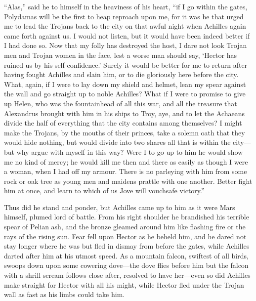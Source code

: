“Alas,” said he to himself in the heaviness of his heart, “if I go within
the gates, Polydamas will be the first to heap reproach upon me, for it
was he that urged me to lead the Trojans back to the city on that awful
night when Achilles again came forth against us. I would not listen, but
it would have been indeed better if I had done so. Now that my folly has
destroyed the host, I dare not look Trojan men and Trojan women in the
face, lest a worse man should say, ‘Hector has ruined us by his
self-confidence.’ Surely it would be better for me to return after having
fought Achilles and slain him, or to die gloriously here before the city.
What, again, if I were to lay down my shield and helmet, lean my spear
against the wall and go straight up to noble Achilles? What if I were to
promise to give up Helen, who was the fountainhead of all this war, and
all the treasure that Alexandrus brought with him in his ships to Troy,
aye, and to let the Achaeans divide the half of everything that the city
contains among themselves? I might make the Trojans, by the mouths of
their princes, take a solemn oath that they would hide nothing, but would
divide into two shares all that is within the city—but why argue
with myself in this way? Were I to go up to him he would show me no kind
of mercy; he would kill me then and there as easily as though I were a
woman, when I had off my armour. There is no parleying with him from some
rock or oak tree as young men and maidens prattle with one another. Better
fight him at once, and learn to which of us Jove will vouchsafe victory.”

Thus did he stand and ponder, but Achilles came up to him as it were Mars
himself, plumed lord of battle. From his right shoulder he brandished his
terrible spear of Pelian ash, and the bronze gleamed around him like
flashing fire or the rays of the rising sun. Fear fell upon Hector as he
beheld him, and he dared not stay longer where he was but fled in dismay
from before the gates, while Achilles darted after him at his utmost
speed. As a mountain falcon, swiftest of all birds, swoops down upon some
cowering dove—the dove flies before him but the falcon with a shrill
scream follows close after, resolved to have her—even so did
Achilles make straight for Hector with all his might, while Hector fled
under the Trojan wall as fast as his limbs could take him.

